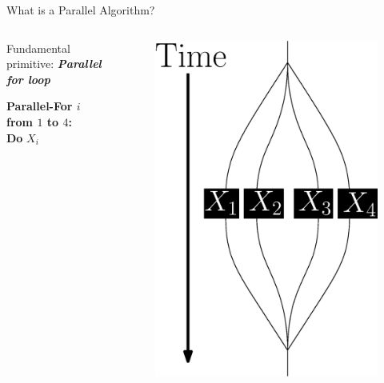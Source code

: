\documentclass[xcolor=x11names, svgnames, rgb]{beamer}
\newcommand{\defn}[1]       {{\textit{\textbf{\boldmath #1}}}}
\begin{document}
\begin{frame}[t]{What is a Parallel Algorithm?}

	\begin{columns}[T] %
	\begin{column}{.45\textwidth}
	Fundamental primitive: \defn{Parallel for loop}
	\vspace{2cm}

        \textbf{Parallel-For $i$ from $1$ to $4$: } \\
        \hspace{1 cm} \textbf{Do }$X_i$


	\end{column}
	\hfill
	\begin{column}{.60\textwidth}
	\begin{figure}
		\includegraphics[width=0.75\linewidth]{imgs/altParallelForLoop.eps}
	\end{figure}
	\end{column}
	\end{columns}

\end{frame}
\end{document}
